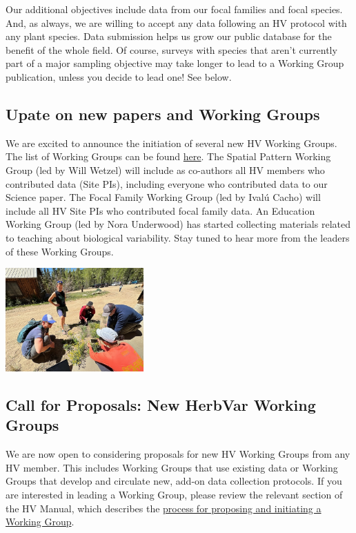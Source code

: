 \documentclass[
  12pt,
]{article}
\begin{document}
Our additional objectives include data from our focal families and focal
species. And, as always, we are willing to accept any data following an
HV protocol with any plant species. Data submission helps us grow our
public database for the benefit of the whole field. Of course, surveys
with species that aren't currently part of a major sampling objective
may take longer to lead to a Working Group publication, unless you
decide to lead one! See below.

\subsection{Upate on new papers and Working Groups}\label{wg1}

We are excited to announce the initiation of several new HV Working
Groups. The list of Working Groups can be found
\href{https://herbvar.org/workingGroups.html}{here}. The Spatial Pattern
Working Group (led by Will Wetzel) will include as co-authors all HV
members who contributed data (Site PIs), including everyone who
contributed data to our Science paper. The Focal Family Working Group
(led by Ivalú Cacho) will include all HV Site PIs who contributed focal
family data. An Education Working Group (led by Nora Underwood) has
started collecting materials related to teaching about biological
variability. Stay tuned to hear more from the leaders of these Working
Groups.

\includegraphics[width=2.08333in,height=\textheight]{images_2025-01/IMG_3997.jpeg}

\subsection{Call for Proposals: New HerbVar Working Groups}\label{wg2}

We are now open to considering proposals for new HV Working Groups from
any HV member. This includes Working Groups that use existing data or
Working Groups that develop and circulate new, add-on data collection
protocols. If you are interested in leading a Working Group, please
review the relevant section of the HV Manual, which describes the
\href{https://herbvar-network.github.io/herbvar_manual/collaboration/working-group-pubs.html}{process
for proposing and initiating a Working Group}.
\end{document}
